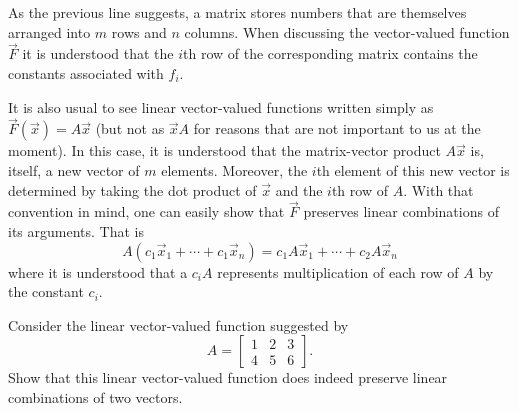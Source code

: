 \documentclass[../book.tex]{subfiles}
\begin{document}
As the previous line suggests, a matrix stores numbers that are themselves arranged into \(m\) rows and \(n\) columns. When discussing the vector-valued function \(\vec{F}\) it is understood that the \(i\)th row of the corresponding matrix contains the constants associated with \(f_i\).

It is also usual to see linear vector-valued functions written simply as \(\vec{F}(\vec{x}) = A \vec{x}\) (but not as \(\vec{x} A\) for reasons that are not important to us at the moment). In this case, it is understood that the matrix-vector product \(A \vec{x}\) is, itself, a new vector of \(m\) elements. Moreover, the \(i\)th element of this new vector is determined by taking the dot product of \(\vec{x}\) and the \(i\)th row of \(A\). With that convention in mind, one can easily show that \(\vec{F}\) preserves linear combinations of its arguments. That is
\begin{equation}\label{eq:vec-27}
A (c_1 \vec{x}_1 + \cdots + c_1  \vec{x}_n)
=
c_1 A \vec{x}_1 + \cdots + c_2  A  \vec{x}_n 
\end{equation}
where it is understood that a \(c_i  A\) represents multiplication of each row of \(A\) by the constant \(c_i\).

\begin{example} \label{eg:linearity2}
Consider the linear vector-valued function suggested by
\begin{equation}\label{eq:vec-28}
A
=
\begin{bmatrix}
  1 & 2 & 3 \\
  4 & 5 & 6
\end{bmatrix}.
\end{equation}
Show that this linear vector-valued function does indeed preserve linear combinations of two vectors.
\end{example}
\end{document}
